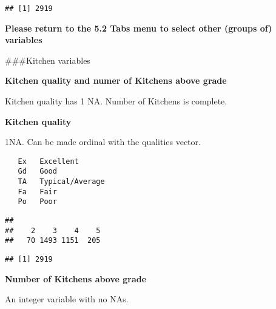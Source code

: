 \documentclass[]{article}
\newenvironment{Shaded}{\begin{snugshade}}{\end{snugshade}}
\newcommand{\CommentTok}[1]{\textcolor[rgb]{0.56,0.35,0.01}{\textit{#1}}}
\newcommand{\KeywordTok}[1]{\textcolor[rgb]{0.13,0.29,0.53}{\textbf{#1}}}
\newcommand{\NormalTok}[1]{#1}
\newcommand{\OperatorTok}[1]{\textcolor[rgb]{0.81,0.36,0.00}{\textbf{#1}}}
\newcommand{\StringTok}[1]{\textcolor[rgb]{0.31,0.60,0.02}{#1}}
\begin{document}
\begin{verbatim}
## [1] 2919
\end{verbatim}

\textbf{Please return to the 5.2 Tabs menu to select other (groups of)
variables}

\#\#\#Kitchen variables

\textbf{Kitchen quality and numer of Kitchens above grade}

Kitchen quality has 1 NA. Number of Kitchens is complete.

\textbf{Kitchen quality}

1NA. Can be made ordinal with the qualities vector.

\begin{verbatim}
   Ex   Excellent
   Gd   Good
   TA   Typical/Average
   Fa   Fair
   Po   Poor
\end{verbatim}

\begin{Shaded}
\end{Shaded}

\begin{verbatim}
## 
##    2    3    4    5 
##   70 1493 1151  205
\end{verbatim}

\begin{Shaded}
\end{Shaded}

\begin{verbatim}
## [1] 2919
\end{verbatim}

\textbf{Number of Kitchens above grade}

An integer variable with no NAs.

\begin{Shaded}
\end{Shaded}
\end{document}
